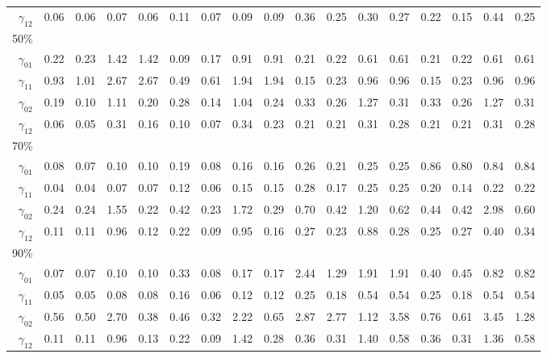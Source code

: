 \documentclass[useAMS,usenatbib,referee]{biom}
\begin{document}
\begin{table}
\begin{tabular}{rrrrrrrrrrrrrrrrr}
$\gamma_{12}$ & 0.06 & 0.06 & 0.07 & 0.06 & 0.11 & 0.07 & 0.09 & 0.09 & 0.36 & 0.25 & 0.30 & 0.27 & 0.22 & 0.15 & 0.44 & 0.25 \\
50\% \\
$\gamma_{01}$ & 0.22 & 0.23 & 1.42 & 1.42 & 0.09 & 0.17 & 0.91 & 0.91 & 0.21 & 0.22 & 0.61 & 0.61 & 0.21 & 0.22 & 0.61 & 0.61 \\
$\gamma_{11}$  & 0.93 & 1.01 & 2.67 & 2.67 & 0.49 & 0.61 & 1.94 & 1.94 & 0.15 & 0.23 & 0.96 & 0.96 & 0.15 & 0.23 & 0.96 & 0.96 \\
$\gamma_{02}$  & 0.19 & 0.10 & 1.11 & 0.20 & 0.28 & 0.14 & 1.04 & 0.24 & 0.33 & 0.26 & 1.27 & 0.31 & 0.33 & 0.26 & 1.27 & 0.31 \\
$\gamma_{12}$  & 0.06 & 0.05 & 0.31 & 0.16 & 0.10 & 0.07 & 0.34 & 0.23 & 0.21 & 0.21 & 0.31 & 0.28 & 0.21 & 0.21 & 0.31 & 0.28 \\
70\% \\
$\gamma_{01}$  & 0.08 & 0.07 & 0.10 & 0.10 & 0.19 & 0.08 & 0.16 & 0.16 & 0.26 & 0.21 & 0.25 & 0.25 & 0.86 & 0.80 & 0.84 & 0.84 \\
$\gamma_{11}$  & 0.04 & 0.04 & 0.07 & 0.07 & 0.12 & 0.06 & 0.15 & 0.15 & 0.28 & 0.17 & 0.25 & 0.25 & 0.20 & 0.14 & 0.22 & 0.22 \\
$\gamma_{02}$  & 0.24 & 0.24 & 1.55 & 0.22 & 0.42 & 0.23 & 1.72 & 0.29 & 0.70 & 0.42 & 1.20 & 0.62 & 0.44 & 0.42 & 2.98 & 0.60 \\
$\gamma_{12}$  & 0.11 & 0.11 & 0.96 & 0.12 & 0.22 & 0.09 & 0.95 & 0.16 & 0.27 & 0.23 & 0.88 & 0.28 & 0.25 & 0.27 & 0.40 & 0.34 \\
90\% \\
$\gamma_{01}$  & 0.07 & 0.07 & 0.10 & 0.10 & 0.33 & 0.08 & 0.17 & 0.17 & 2.44 & 1.29 & 1.91 & 1.91 & 0.40 & 0.45 & 0.82 & 0.82 \\
$\gamma_{11}$  & 0.05 & 0.05 & 0.08 & 0.08 & 0.16 & 0.06 & 0.12 & 0.12 & 0.25 & 0.18 & 0.54 & 0.54 & 0.25 & 0.18 & 0.54 & 0.54 \\
$\gamma_{02}$  & 0.56 & 0.50 & 2.70 & 0.38 & 0.46 & 0.32 & 2.22 & 0.65 & 2.87 & 2.77 & 1.12 & 3.58 & 0.76 & 0.61 & 3.45 & 1.28 \\
$\gamma_{12}$  & 0.11 & 0.11 & 0.96 & 0.13 & 0.22 & 0.09 & 1.42 & 0.28 & 0.36 & 0.31 & 1.40 & 0.58 & 0.36 & 0.31 & 1.36 & 0.58 \\
\hline
  \end{tabular}

\end{table}
\end{document}
